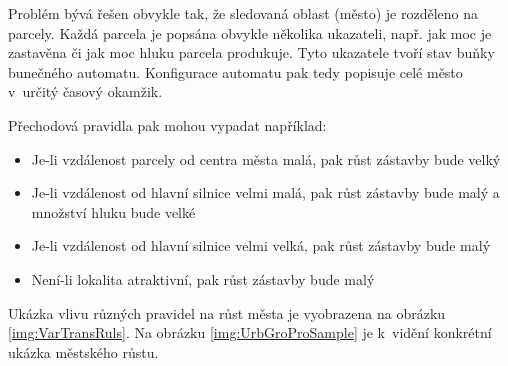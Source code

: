 Problém bývá řešen obvykle tak, že sledovaná oblast (město) je rozděleno na parcely. Každá parcela je popsána obvykle několika ukazateli, např. jak moc je zastavěna či jak moc hluku parcela produkuje. Tyto ukazatele tvoří stav buňky bunečného automatu. Konfigurace automatu pak tedy popisuje celé město v~určitý časový okamžik.

Přechodová pravidla pak mohou vypadat například:
\begin{itemize}
 \item Je-li vzdálenost parcely od centra města malá, pak růst zástavby bude velký
 \item Je-li vzdálenost od hlavní silnice velmi malá, pak růst zástavby bude malý a množství hluku bude velké
 \item Je-li vzdálenost od hlavní silnice velmi velká, pak růst zástavby bude malý
 \item Není-li lokalita atraktivní, pak růst zástavby bude malý
\end{itemize}

Ukázka vlivu různých pravidel na růst města je vyobrazena na obrázku \ref{img:VarTransRuls}. Na obrázku \ref{img:UrbGroProSample} je k~vidění konkrétní ukázka městského růstu.

